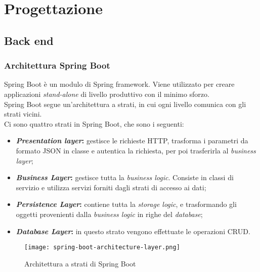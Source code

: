 \section{Progettazione}
\label{sec:progettazione}

\subsection{Back end}
\subsubsection{Architettura Spring Boot}
Spring Boot è un modulo di Spring \gls{framework}. Viene utilizzato per creare
applicazioni \textit{stand-alone} di livello produttivo con il minimo sforzo.\\
Spring Boot segue un'architettura a strati, in cui ogni livello comunica con
gli strati vicini.\\
Ci sono quattro strati in Spring Boot, che sono i seguenti:
\begin{itemize}
    \item \textbf{\textit{Presentation layer}:} gestisce le richieste HTTP,
          trasforma i parametri da formato JSON in classe e autentica la
          richiesta, per
          poi trasferirla al \textit{business layer};
    \item \textbf{\textit{Business Layer}:} gestisce tutta la \textit{business
              logic}. Consiste in classi di servizio e utilizza servizi forniti
          dagli strati
          di accesso ai dati;
    \item \textbf{\textit{Persistence Layer}:} contiene tutta la
          \textit{storage logic}, e trasformando gli oggetti provenienti dalla
          \textit{business logic} in righe del \textit{database};
    \item \textbf{\textit{Database Layer}:} in questo strato vengono effettuate
          le operazioni \gls{CRUD}.
\end{itemize}
\begin{figure}[H]
    \centering
    \texttt{[image: spring-boot-architecture-layer.png]}
    \caption{Architettura a strati di Spring Boot}
\end{figure}


